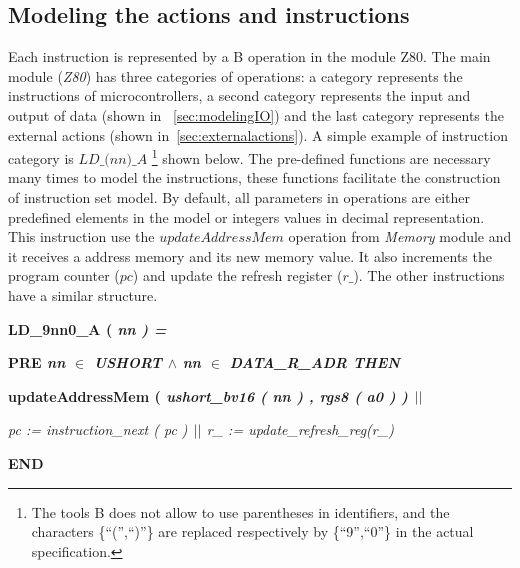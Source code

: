 \documentclass[a4paper]{llncs}
\newcommand{\footnoteremember}[2]{
  \footnote{#2}
  \newcounter{#1}
  \setcounter{#1}{\value{footnote}}
}
\begin{document}
\subsection{Modeling the actions and instructions}

Each instruction is represented by a B operation in the module Z80. The main
module (\textit{Z80}) has three categories of operations: a category represents the 
instructions of microcontrollers, a second category represents the input and output of data 
(shown in ~\ref{sec:modelingIO}) and the last category represents the external
actions (shown in~\ref{sec:externalactions}). A simple example of instruction category is
$\textit{LD\_(nn)\_A}$\footnoteremember{myfootnote}{The tools B does not allow
to use parentheses in identifiers, and the characters \{``('',``)''\} are
replaced respectively by \{``9'',``0''\} in the actual specification.} shown below. The
pre-defined functions are necessary many times to model the instructions, these
functions facilitate the construction of instruction set model. By default, all
parameters in operations are either predefined elements in the model or
integers values in decimal representation. This instruction use the
$\textit{updateAddressMem}$ operation from \textit{Memory} module and it receives
a address memory and its new memory value. It also increments the program
counter ($\textit{pc}$) and update the refresh register ($\textit{r\_}$).
The other instructions have a similar structure.

\hspace*{0.00in}\bf LD\_9nn0\_A \rm ( \it nn \rm ) \rm =

\hspace*{0.20in}\bf PRE \it nn $\in$ \it USHORT\hspace*{0.15in} $\land$ \hspace*{0.10in}\it nn\hspace*{0.10in} $\in$  \it DATA\_R\_ADR \hspace*{0.10in}\bf THEN

\hspace*{0.20in}\bf updateAddressMem \rm ( \it ushort\_bv16 \rm ( \it nn \rm ) \rm , \it rgs8 \rm ( \it a0 \rm )
\rm )  $\mbox{$\mid\mid$}$

\hspace*{0.20in}\it pc \rm := \it instruction\_next \rm ( \it pc \rm )  $\mbox{$\mid\mid$}$  \it r\_ \rm := \it update\_refresh\_reg\rm (\it r\_\rm )

\hspace*{0.00in}\bf END\rm 
\end{document}
